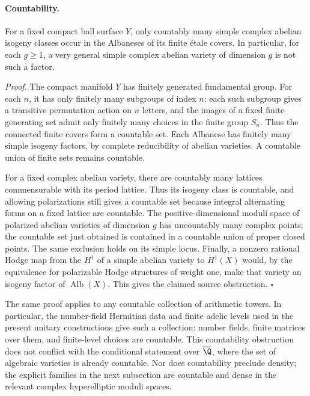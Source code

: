 \paragraph{Countability.}
For a fixed compact ball surface $Y$, only countably many simple complex
abelian isogeny classes occur in the Albaneses of its finite \'{e}tale
covers.  In particular, for each $g\geq1$, a very general simple complex
abelian variety of dimension $g$ is not such a factor.

\emph{Proof.}
The compact manifold $Y$ has finitely generated fundamental group.  For
each $n$, it has only finitely many subgroups of index $n$: each such
subgroup gives a transitive permutation action on $n$ letters, and the
images of a fixed finite generating set admit only finitely many choices
in the finite group $S_n$.  Thus the connected finite covers form a
countable set.  Each Albanese has finitely many simple isogeny factors,
by complete reducibility of abelian varieties.  A countable union of
finite sets remains countable.

For a fixed complex abelian variety, there are countably many lattices
commensurable with its period lattice.  Thus its isogeny class is
countable, and allowing polarizations still gives a countable set because
integral alternating forms on a fixed lattice are countable.  The
positive-dimensional moduli space of polarized abelian varieties of
dimension $g$ has uncountably many complex points; the countable set just
obtained is contained in a countable union of proper closed points.
The same exclusion holds on its simple locus.  Finally, a nonzero rational
Hodge map from the $H^1$ of a simple abelian variety to $H^1(X)$ would,
by the equivalence for polarizable Hodge structures of weight one, make
that variety an isogeny factor of $\operatorname{Alb}(X)$.  This gives the
claimed source obstruction. \hfill$\square$

The same proof applies to any countable collection of arithmetic towers.
In particular, the number-field Hermitian data and finite adelic levels
used in the present unitary constructions give such a collection: number
fields, finite matrices over them, and finite-level choices are countable.
This countability obstruction does not conflict with the conditional
statement over $\overline{\Q}$, where the set of algebraic varieties is
already countable.  Nor does countability preclude density; the explicit
families in the next subsection are countable and dense in the relevant
complex hyperelliptic moduli spaces.

